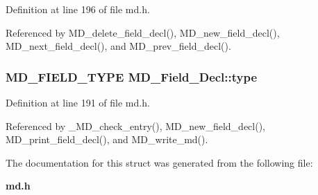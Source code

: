 Definition at line 196 of file md.h.

Referenced by MD\_\-delete\_\-field\_\-decl(), MD\_\-new\_\-field\_\-decl(), MD\_\-next\_\-field\_\-decl(), and MD\_\-prev\_\-field\_\-decl().
\subsubsection{\setlength{\rightskip}{0pt plus 5cm}\bf{MD\_\-FIELD\_\-TYPE} \bf{MD\_\-Field\_\-Decl::type}}\label{structMD__Field__Decl_4fe7866fe91318b8730183542d2040cd}




Definition at line 191 of file md.h.

Referenced by \_\-MD\_\-check\_\-entry(), MD\_\-new\_\-field\_\-decl(), MD\_\-print\_\-field\_\-decl(), and MD\_\-write\_\-md().

The documentation for this struct was generated from the following file:\begin{CompactItemize}
\item 
\bf{md.h}\end{CompactItemize}
